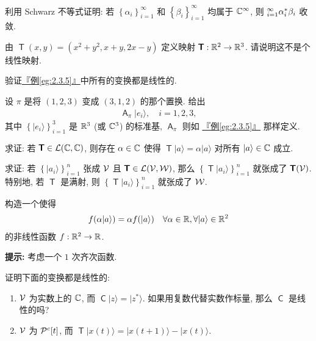 \documentclass[lang=cn,zihao=-4,twoside,fontset=none]{textbook}
\let\sum\relax
\newcommand{\bsf}[1]{{\mathop{\pmb{\mathsf{#1}}}}}
\def\eq#1{\[\begin{aligned}{}#1\end{aligned}\]}
\newcommand{\egref}[1]{\hyperref[#1]{『例\textnormal{\ref*{#1}}』}}
\newcommand{\Set}[1]{\left\{#1\right\}}
\newcommand{\nalph}{\textnormal{(\alph*)}}
\renewcommand{\ket}[1]{| #1 \rangle}
\begin{document}
\begin{problem}
    \label{ex:2.18}%
    利用 Schwarz 不等式证明: 若 $\Set{\alpha_i}_{i=1}^\infty$ 和 $\Set{\beta_i}_{i=1}^\infty$ 均属于 ${\mathbb C}^\infty$, 则 $\sum_{i=1}^\infty\alpha_i^*\beta_i$ 收敛. 
\end{problem}

\begin{problem}
    \label{ex:2.19}%
    由 $\bsf{T}(x,y)=(x^2+y^2,x+y,2x-y)$ 定义映射 $\bsf{T}:\bR^2\to\bR^3$. 请说明这不是个线性映射. 
\end{problem}

\begin{problem}
    \label{ex:2.20}%
    验证\egref{eg:2.3.5}中所有的变换都是线性的.
\end{problem}

\begin{problem}
    \label{ex:2.21}%
    设 $\pi$ 是将 $(1,2,3)$ 变成 $(3,1,2)$ 的那个置换. 给出 
    \eq{
        \bsf{A}_\pi\ket{e_i}, \quad i=1,2,3,
    }
    其中 $\Set{\ket{e_i}}_{i=1}^3$ 是 ${\mathbb R}^3$ (或 ${\mathbb C}^3$) 的标准基, $\bsf{A}_\pi$ 则如 \egref{eg:2.3.5} 那样定义.
\end{problem}

\begin{problem}
    \label{ex:2.22}%
    求证: 若 $\bsf{T}\in\mL(\bC,\bC)$, 则存在 $\alpha\in{\mathbb C}$ 使得 $\bsf T\ket{a}=\alpha\ket{a}$ 对所有 $\ket{a}\in\bC$ 成立. 
\end{problem}

\begin{problem}
    \label{ex:2.23}%
    求证: 若 $\Set{\ket{a_i}}_{i=1}^n$ 张成 ${\mathcal V}$ 且 $\bsf{T}\in\mL(\mV,\mW)$, 那么 $\Set{\bsf{T}\ket{a_i}}_{i=1}^n$ 就张成了 $\bsf{T}(\mV)$. 特别地, 若 $\bsf T$ 是满射, 则 $\Set{\bsf{T}\ket{a_i}}_{i=1}^n$ 就张成了 ${\mathcal W}$.
\end{problem}

\begin{problem}
    \label{ex:2.24}%
    构造一个使得 
    \eq{
        f(\alpha\ket{a})=\alpha f(\ket{a}) \quad \forall \alpha\in\bR, \forall\ket{a}\in\bR^2
    }
    的非线性函数 $f:{\mathbb R}^2\to{\mathbb R}$. 
    
    \noindent\textbf{提示:} 考虑一个 $1$ 次齐次函数.
\end{problem}

\begin{problem}
    \label{ex:2.25}%
    证明下面的变换都是线性的:
    \begin{enumerate}[label=\nalph]
        \item ${\mathcal V}$ 为实数上的 ${\mathbb C}$, 而 $\bsf{C}\ket{z}=\ket{z^*}$. 如果用复数代替实数作标量, 那么 $\bsf{C}$ 是线性的吗?
        \item ${\mathcal V}$ 为 ${\mathcal P}^c[t]$, 而 $\bsf{T}\ket{x(t)}=\ket{x(t+1)}-\ket{x(t)}$.
    \end{enumerate}
\end{problem}
\end{document}
